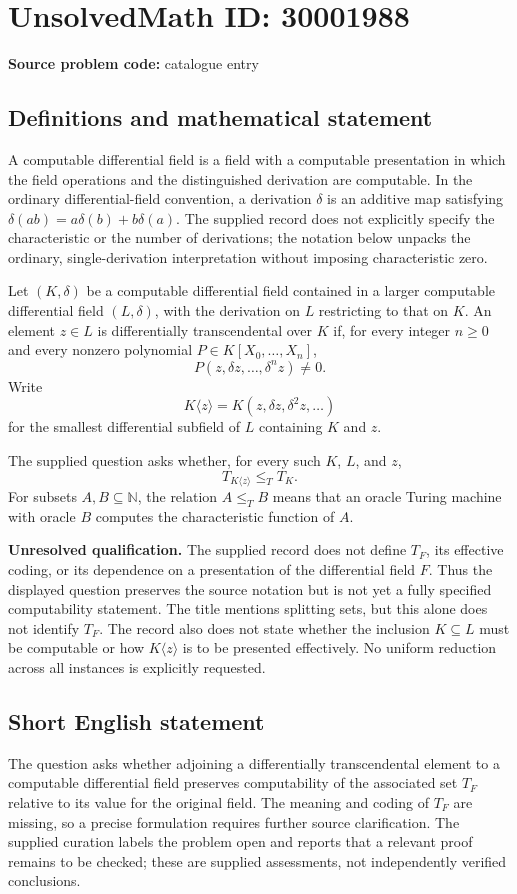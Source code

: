 \documentclass[11pt]{article}
\newcommand{\N}{\mathbb{N}}
\begin{document}
\section*{UnsolvedMath ID: 30001988}
\textbf{Source problem code:} catalogue entry
\subsection{Definitions and mathematical statement}
A computable differential field is a field with a computable presentation in which the field operations and the distinguished derivation are computable. In the ordinary differential-field convention, a derivation \(\delta\) is an additive map satisfying \(\delta(ab)=a\delta(b)+b\delta(a)\). The supplied record does not explicitly specify the characteristic or the number of derivations; the notation below unpacks the ordinary, single-derivation interpretation without imposing characteristic zero.

Let \((K,\delta)\) be a computable differential field contained in a larger computable differential field \((L,\delta)\), with the derivation on \(L\) restricting to that on \(K\). An element \(z\in L\) is differentially transcendental over \(K\) if, for every integer \(n\geq 0\) and every nonzero polynomial \(P\in K[X_0,\ldots,X_n]\),
\[
P(z,\delta z,\ldots,\delta^n z)\neq 0.
\]
Write
\[
K\langle z\rangle=K(z,\delta z,\delta^2z,\ldots)
\]
for the smallest differential subfield of \(L\) containing \(K\) and \(z\).

The supplied question asks whether, for every such \(K\), \(L\), and \(z\),
\[
T_{K\langle z\rangle}\leq_T T_K.
\]
For subsets \(A,B\subseteq\N\), the relation \(A\leq_T B\) means that an oracle Turing machine with oracle \(B\) computes the characteristic function of \(A\).

\textbf{Unresolved qualification.} The supplied record does not define \(T_F\), its effective coding, or its dependence on a presentation of the differential field \(F\). Thus the displayed question preserves the source notation but is not yet a fully specified computability statement. The title mentions splitting sets, but this alone does not identify \(T_F\). The record also does not state whether the inclusion \(K\subseteq L\) must be computable or how \(K\langle z\rangle\) is to be presented effectively. No uniform reduction across all instances is explicitly requested.
\subsection{Short English statement}
The question asks whether adjoining a differentially transcendental element to a computable differential field preserves computability of the associated set \(T_F\) relative to its value for the original field. The meaning and coding of \(T_F\) are missing, so a precise formulation requires further source clarification. The supplied curation labels the problem open and reports that a relevant proof remains to be checked; these are supplied assessments, not independently verified conclusions.
\end{document}
